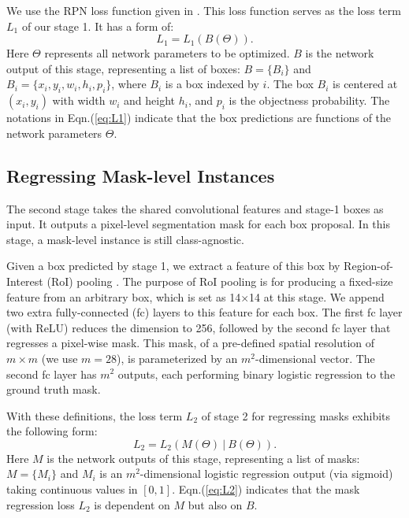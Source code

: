 \documentclass[10pt,twocolumn,letterpaper]{article}
\begin{document}
We use the RPN loss function given in \cite{Ren2015}. This loss function serves as the loss term $L_1$ of our stage 1.
It has a form of:
\begin{equation}\label{eq:L1}
L_1 = L_1(B(\Theta)).
\end{equation}
Here $\Theta$ represents all network parameters to be optimized. $B$ is the network output of this stage, representing a list of boxes: $B=\{B_i\}$ and $B_i=\{x_i, y_i, w_i, h_i, p_i\}$, where $B_i$ is a box indexed by $i$. The box $B_i$ is centered at $(x_i, y_i)$ with width $w_i$ and height $h_i$, and $p_i$ is the objectness probability.
The notations in Eqn.(\ref{eq:L1}) indicate that the box predictions are functions of the network parameters $\Theta$.

\subsection{Regressing Mask-level Instances}

The second stage takes the shared convolutional features and stage-1 boxes as input. It outputs a pixel-level segmentation mask for each box proposal. In this stage, a mask-level instance is still class-agnostic.

Given a box predicted by stage 1, we extract a feature of this box by Region-of-Interest (RoI) pooling \cite{He2014,Girshick2015}.
The purpose of RoI pooling is for producing a fixed-size feature from an arbitrary box, which is set as 14$\times$14 at this stage.
We append two extra fully-connected (fc) layers to this feature for each box. The first fc layer (with ReLU) reduces the dimension to 256, followed by the second fc layer that regresses a pixel-wise mask. This mask, of a pre-defined spatial resolution of $m\times m$ (we use $m=28$), is parameterized by an $m^2$-dimensional vector. The second fc layer has $m^2$ outputs, each performing binary logistic regression to the ground truth mask.

With these definitions, the loss term $L_2$ of stage 2 for regressing masks exhibits the following form:
\begin{equation}\label{eq:L2}
L_2 = L_2(M(\Theta) ~|~B(\Theta)).
\end{equation}
Here $M$ is the network outputs of this stage, representing a list of masks: $M=\{M_i\}$ and $M_i$ is an $m^2$-dimensional logistic regression output (via sigmoid) taking continuous values in $[0, 1]$. Eqn.(\ref{eq:L2}) indicates that the mask regression loss $L_2$ is dependent on $M$ but also on $B$.
\end{document}
